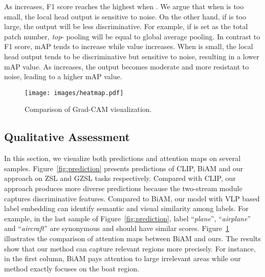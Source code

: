 \documentclass[letterpaper]{article} \usepackage{aaai23}  \usepackage{times}  \usepackage{helvet}  \usepackage{courier}  \usepackage[hyphens]{url}  \usepackage{graphicx} \urlstyle{rm} \def\UrlFont{\rm}  \usepackage{natbib}  \usepackage{caption} \frenchspacing  \setlength{\pdfpagewidth}{8.5in}  \setlength{\pdfpageheight}{11in}
\begin{document}
As  increases, F1 score reaches the highest when .
We argue that when  is too small, the local head output is sensitive to noise. 
On the other hand, if  is too large, the output will be less discriminative. 
For example, if  is set as the total patch number, \textit{top}- pooling will be equal to global average pooling.
In contrast to F1 score, mAP tends to increase while  value increases.
When  is small, the local head output tends to be discriminative but sensitive to noise, resulting in a lower mAP value.
As  increases, the output becomes moderate and more resistant to noise, leading to a higher mAP value.
\begin{figure}[t]
\centering
\texttt{[image: images/heatmap.pdf]}
\caption{
Comparison of Grad-CAM visualization.
}
\label{fig:heatmap}
\end{figure} \subsection{Qualitative Assessment}
In this section, we visualize both predictions and attention maps on several samples.
Figure~\ref{fig:prediction} presents predictions of CLIP, BiAM and our approach on ZSL and GZSL tasks respectively. 
Compared with CLIP, our approach produces more diverse predictions because the two-stream module captures discriminative features. 
Compared to BiAM, our model with VLP based label embedding can identify semantic and visual similarity among labels.  
For example, in the last sample of Figure~\ref{fig:prediction},  label ``\textit{plane}'', ``\textit{airplane}'' and ``\textit{aircraft}'' are synonymous and should have similar scores.
Figure~\ref{fig:heatmap} illustrates the comparison of attention maps between BiAM and ours. 
The results show that our method can capture relevant regions more precisely. 
For instance, in the first column, BiAM pays attention to large irrelevant areas while our method exactly focuses on the boat region.
\end{document}
